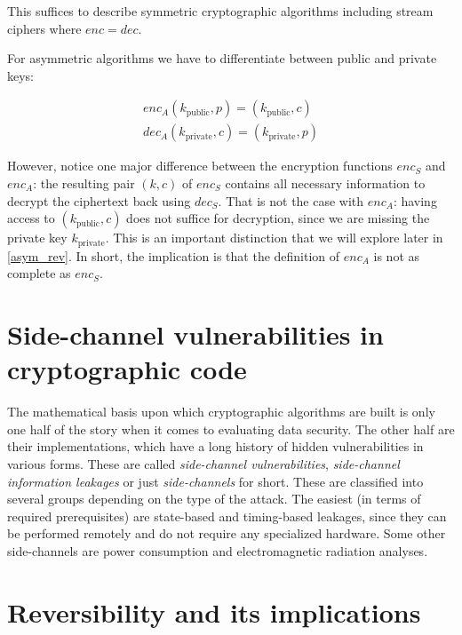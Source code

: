 \documentclass[a4paper,10pt,openright]{memoir}
\def\enc{\ensuremath{\mathit{enc}}}
\def\dec{\ensuremath{\mathit{dec}}}
\newcommand{\term}[1]{\textit{#1}}
\begin{document}
This suffices to describe symmetric cryptographic algorithms including 
stream ciphers where $\enc = \dec$.

For asymmetric algorithms we have to differentiate between public and 
private keys:

\begin{align*}
\enc_A(k_\text{public},p) = (k_\text{public},c) \\
\dec_A(k_\text{private},c) = (k_\text{private},p) 
\end{align*}

However, notice one major difference between the encryption functions 
$\enc_S$ and $\enc_A$: the resulting pair $(k, c)$ of $\enc_S$ contains 
all necessary information to decrypt the ciphertext back using 
$\dec_S$. That is not the case with $\enc_A$: having access to 
$(k_\text{public},c)$ does not suffice for decryption, since we are 
missing the private key $k_\text{private}$. This is an important 
distinction that we will explore later in \ref{asym_rev}. In short, the 
implication is that the definition of $\enc_A$ is not as complete as 
$\enc_S$.

\section{Side-channel vulnerabilities in cryptographic code}

The mathematical basis upon which cryptographic algorithms are built is 
only one half of the story when it comes to evaluating data security. 
The other half are their implementations, which have a long history of 
hidden vulnerabilities in various forms. These are called 
\term{side-channel vulnerabilities}, \term{side-channel information 
leakages} or just \term{side-channels} for short. These are classified 
into several groups depending on the type of the attack. The easiest 
(in terms of required prerequisites) are state-based and timing-based 
leakages, since they can be performed remotely and do not require any 
specialized hardware. Some other side-channels are power consumption 
and electromagnetic radiation analyses.


\section{Reversibility and its implications}

\end{document}
